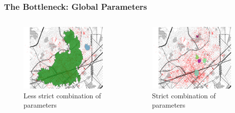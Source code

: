 \documentclass[hyperref={pdfpagelabels=true}]{beamer}
\begin{document}
\begin{frame}
\frametitle{The Bottleneck: Global Parameters}
\begin{columns}
  \begin{column}{0.5\textwidth}
    \begin{figure}  
	\includegraphics[width=\textwidth]{elki_dbscan_005_500.png}\\
           \tiny{Less strict combination of parameters}%
       \end{figure}             
  \end{column}
  \begin{column}{0.5\textwidth}
      \begin{figure}  
	\includegraphics[width=\textwidth]{elki_dbscan_002_500.png}\\
           \tiny{Strict combination of parameters}%
       \end{figure}  
  \end{column}  
\end{columns}
\end{frame}
\end{document}
